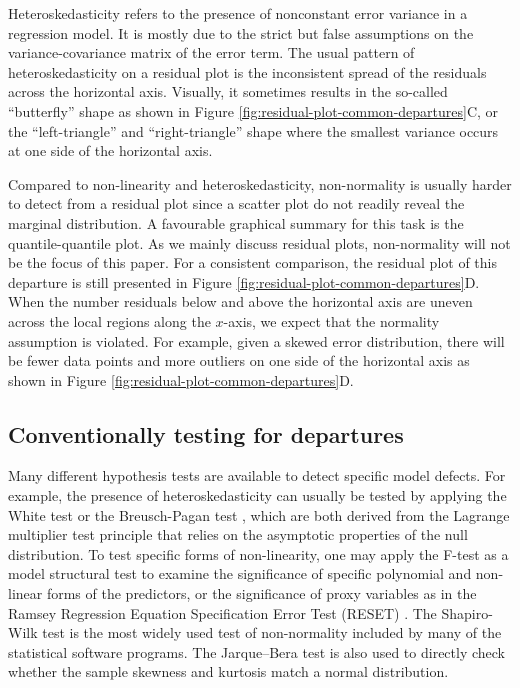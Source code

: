 \documentclass[]{interact}
\theoremstyle{plain}%
\theoremstyle{definition}
\theoremstyle{remark}
\begin{document}
Heteroskedasticity refers to the presence of nonconstant error variance
in a regression model. It is mostly due to the strict but false
assumptions on the variance-covariance matrix of the error term. The
usual pattern of heteroskedasticity on a residual plot is the
inconsistent spread of the residuals across the horizontal axis.
Visually, it sometimes results in the so-called ``butterfly'' shape as
shown in Figure \ref{fig:residual-plot-common-departures}C, or the
``left-triangle'' and ``right-triangle'' shape where the smallest
variance occurs at one side of the horizontal axis.

Compared to non-linearity and heteroskedasticity, non-normality is
usually harder to detect from a residual plot since a scatter plot do
not readily reveal the marginal distribution. A favourable graphical
summary for this task is the quantile-quantile plot. As we mainly
discuss residual plots, non-normality will not be the focus of this
paper. For a consistent comparison, the residual plot of this departure
is still presented in Figure \ref{fig:residual-plot-common-departures}D.
When the number residuals below and above the horizontal axis are uneven
across the local regions along the \(x\)-axis, we expect that the
normality assumption is violated. For example, given a skewed error
distribution, there will be fewer data points and more outliers on one
side of the horizontal axis as shown in Figure
\ref{fig:residual-plot-common-departures}D.

\hypertarget{conventionally-testing-for-departures}{%
\subsection{Conventionally testing for
departures}\label{conventionally-testing-for-departures}}

Many different hypothesis tests are available to detect specific model
defects. For example, the presence of heteroskedasticity can usually be
tested by applying the White test
\citep{white_heteroskedasticity-consistent_1980} or the Breusch-Pagan
test \citep{breusch_simple_1979}, which are both derived from the
Lagrange multiplier test \citep{silvey1959lagrangian} principle that
relies on the asymptotic properties of the null distribution. To test
specific forms of non-linearity, one may apply the F-test as a model
structural test to examine the significance of specific polynomial and
non-linear forms of the predictors, or the significance of proxy
variables as in the Ramsey Regression Equation Specification Error Test
(RESET) \citep{ramsey_tests_1969}. The Shapiro-Wilk test
\citep{shapiro1965analysis} is the most widely used test of
non-normality included by many of the statistical software programs. The
Jarque--Bera test \citep{jarque1980efficient} is also used to directly
check whether the sample skewness and kurtosis match a normal
distribution.
\end{document}
